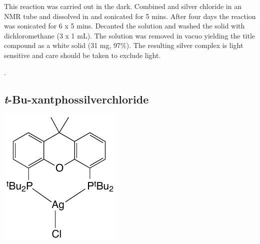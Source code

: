 This reaction was carried out in the dark.  Combined  and silver chloride in an NMR tube and dissolved in  and sonicated for 5 mins.  After four days the reaction was sonicated for 6 x 5 mins.  Decanted the solution and washed the solid with dichloromethane (3 x 1 mL).  The solution was removed in vacuo yielding the title compound as a white solid (31 mg, 97\%).  The resulting silver complex is light sensitive and care should be taken to exclude light.

 
 
.



\subsection*{\emph{t}-Bu-xantphossilverchloride} 

\begin{structure}[h]
\begin{center}
\includegraphics{../Structures/CtBuSilverChloride.pdf}
\end{center}
\end{structure}


